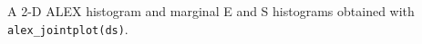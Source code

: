 \label{fig:alex_jointplot} A 2-D ALEX histogram and marginal E and S histograms obtained with \texttt{alex\_jointplot(ds)}.